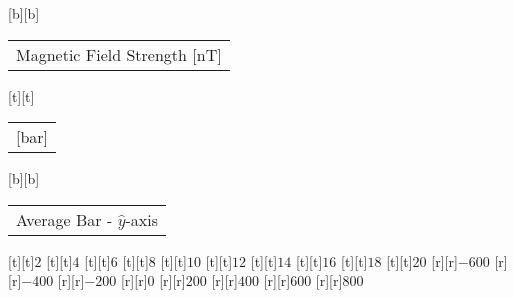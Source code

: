%
[b][b]{\fontsize{8}{12}\selectfont \setlength{\tabcolsep}{0pt}\begin{tabular}{c}Magnetic Field Strength [nT]\end{tabular}}%
[t][t]{\fontsize{8}{12}\selectfont \setlength{\tabcolsep}{0pt}\begin{tabular}{c}[bar]\end{tabular}}%
[b][b]{\fontsize{8}{12}\selectfont \setlength{\tabcolsep}{0pt}\begin{tabular}{c}Average Bar - $\hat{y}$-axis\end{tabular}}%
%
\fontsize{6}{12}%
\selectfont%
%
[t][t]{$2$}%
[t][t]{$4$}%
[t][t]{$6$}%
[t][t]{$8$}%
[t][t]{$10$}%
[t][t]{$12$}%
[t][t]{$14$}%
[t][t]{$16$}%
[t][t]{$18$}%
[t][t]{$20$}%
%
[r][r]{$-600$}%
[r][r]{$-400$}%
[r][r]{$-200$}%
[r][r]{$0$}%
[r][r]{$200$}%
[r][r]{$400$}%
[r][r]{$600$}%
[r][r]{$800$}%
%
%
